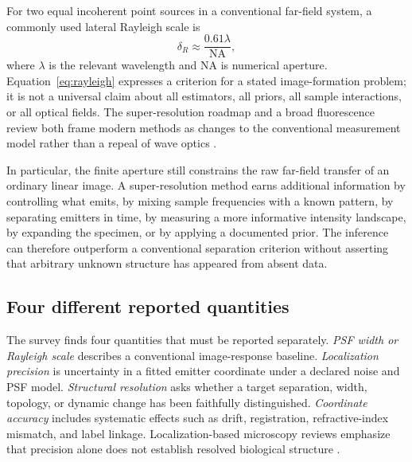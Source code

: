 \documentclass[conference]{IEEEtran}
\begin{document}
For two equal incoherent point sources in a conventional far-field system, a commonly used lateral Rayleigh scale is
\begin{equation}
 \delta_R \approx \frac{0.61\lambda}{\mathrm{NA}},
\label{eq:rayleigh}
\end{equation}
where \(\lambda\) is the relevant wavelength and \(\mathrm{NA}\) is numerical aperture. Equation~\eqref{eq:rayleigh} expresses a criterion for a stated image-formation problem; it is not a universal claim about all estimators, all priors, all sample interactions, or all optical fields. The super-resolution roadmap and a broad fluorescence review both frame modern methods as changes to the conventional measurement model rather than a repeal of wave optics \cite{hell2015,huang2010}.

In particular, the finite aperture still constrains the raw far-field transfer of an ordinary linear image. A super-resolution method earns additional information by controlling what emits, by mixing sample frequencies with a known pattern, by separating emitters in time, by measuring a more informative intensity landscape, by expanding the specimen, or by applying a documented prior. The inference can therefore outperform a conventional separation criterion without asserting that arbitrary unknown structure has appeared from absent data.

\subsection{Four different reported quantities}

The survey finds four quantities that must be reported separately. \emph{PSF width or Rayleigh scale} describes a conventional image-response baseline. \emph{Localization precision} is uncertainty in a fitted emitter coordinate under a declared noise and PSF model. \emph{Structural resolution} asks whether a target separation, width, topology, or dynamic change has been faithfully distinguished. \emph{Coordinate accuracy} includes systematic effects such as drift, registration, refractive-index mismatch, and label linkage. Localization-based microscopy reviews emphasize that precision alone does not establish resolved biological structure \cite{baddeley2018,lelek2021}.
\end{document}
